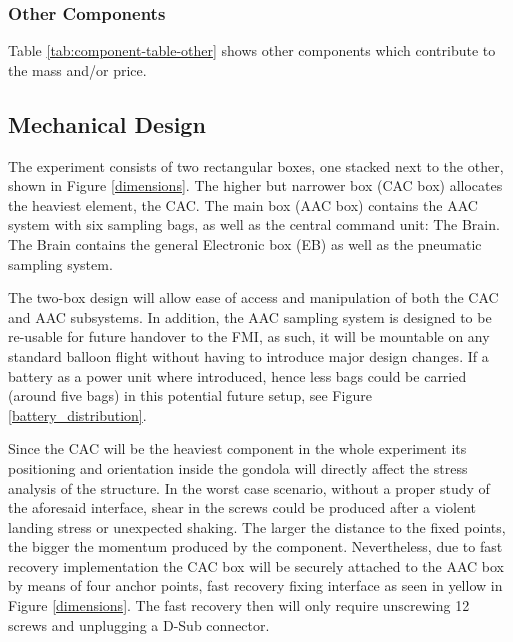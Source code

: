 \documentclass[a4paper,12pt,twoside]{article}
\begin{document}
\begin{landscape}
\subsubsection{Other Components}
Table \ref{tab:component-table-other} shows other components which contribute to the mass and/or price.\\




\raggedbottom
\end{landscape}
\pagebreak
\subsection{Mechanical Design} \label{Mechanical_Design}

The experiment consists of two rectangular boxes, one stacked next to the other, shown in Figure \ref{dimensions}. The higher but narrower box (CAC box) allocates the heaviest element, the CAC. The main box (AAC box) contains the AAC system with six sampling bags, as well as the central command unit: The Brain. The Brain contains the general Electronic box (EB) as well as the pneumatic sampling system.

The two-box design will allow ease of access and manipulation of both the CAC and AAC subsystems. In addition, the AAC sampling system is designed to be re-usable for future handover to the FMI, as such, it will be mountable on any standard balloon flight without having to introduce major design changes. If a battery as a power unit where introduced, hence less bags could be carried (around five bags) in this potential future setup, see Figure \ref{battery_distribution}.

\smallskip
Since the CAC will be the heaviest component in the whole experiment its positioning and orientation inside the gondola will directly affect the stress analysis of the structure. In the worst case scenario, without a proper study of the aforesaid interface, shear in the screws could be produced after a violent landing stress or unexpected shaking. The larger the distance to the fixed points, the bigger the momentum produced by the component. Nevertheless, due to fast recovery implementation the CAC box will be securely attached to the AAC box by means of four anchor points, fast recovery fixing interface as seen in yellow in Figure \ref{dimensions}. The fast recovery then will only require unscrewing 12 screws and unplugging a D-Sub connector.
\end{document}
